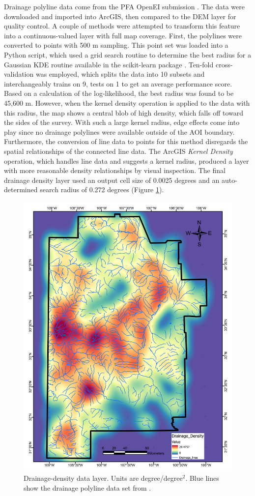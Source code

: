 Drainage polyline data come from the \citet{bielicki_hydrogeolgic_2015} PFA OpenEI submission \citep{kelley_geothermal_2015}. The data were downloaded and imported into ArcGIS, then compared to the DEM layer for quality control. A couple of methods were attempted to transform this feature into a continuous-valued layer with full map coverage. First, the polylines were converted to points with 500 m sampling. This point set was loaded into a Python script, which used a grid search routine to determine the best radius for a Gaussian KDE routine available in the scikit-learn package \citep{pedregosa_scikit-learn_2011}. Ten-fold cross-validation was employed, which splits the data into 10 subsets and interchangeably trains on 9, tests on 1 to get an average performance score. Based on a calculation of the log-likelihood, the best radius was found to be 45,600 m. However, when the kernel density operation is applied to the data with this radius, the map shows a central blob of high density, which falls off toward the sides of the survey. With such a large kernel radius, edge effects come into play since no drainage polylines were available outside of the AOI boundary. Furthermore, the conversion of line data to points for this method disregards the spatial relationships of the connected line data. The ArcGIS \textit{Kernel Density} operation, which handles line data and suggests a kernel radius, produced a layer with more reasonable density relationships by visual inspection. The final drainage density layer used an output cell size of 0.0025 degrees and an auto-determined search radius of 0.272 degrees (Figure \ref{fig:feat_drainage}).

\begin{figure}[H]
\centering
\includegraphics[width=0.75\linewidth]{templates/images/Figure-DrainageDensity.pdf}
\caption[Drainage density data layer]{Drainage-density data layer. Units are degree/degree$^2$. Blue lines show the drainage polyline data set from \protect\citet{bielicki_hydrogeolgic_2015}.}
\label{fig:feat_drainage}
\end{figure}
\pagebreak

